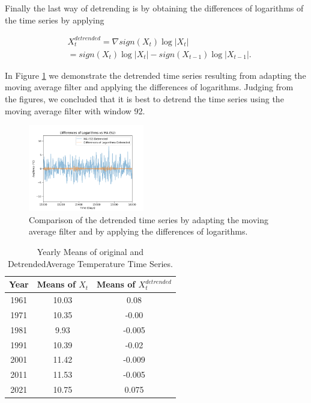 \documentclass[conference]{IEEEtran}
\begin{document}
Finally the last way of detrending is by obtaining the differences of logarithms of the time series by applying

\begin{equation}\label{diflogg}
    \begin{split}
        & X_t^{detrended} = \nabla sign(X_t)\log|X_t| \\
        & = sign(X_t)\log|X_t|-sign(X_{t-1})\log|X_{t-1}|.
    \end{split}
\end{equation}

In Figure \ref{airfdvsmag} we demonstrate the detrended time series resulting from adapting the moving average filter and applying the differences of logarithms. Judging from the figures, we concluded that it is best to detrend the time series using the moving average filter with window 92. 

\begin{figure}[ht]
    \centering
    \includegraphics[width=0.45\textwidth]{Figures/GlasnevinLin/Differences of Logarithms vs MA (92).png}
    \caption{Comparison of the detrended time series by adapting the moving average filter and by applying the differences of logarithms.}
    \label{airfdvsmag}
\end{figure}

\begin{table}
\begin{center}
\begin{tabular}{||c||c||c||} 
 \hline 
 Year & Means of $X_t$ & Means of $X_t^{detrended}$ \\ [0.5ex] 
 \hline\hline
 1961 & 10.03 & 0.08 \\ 
 \hline
 1971 & 10.35 & -0.00 \\
 \hline
 1981 & 9.93 & -0.005\\
 \hline
 1991 & 10.39 &  -0.02\\
 \hline
 2001 & 11.42 &  -0.009\\
 \hline
 2011 & 11.53 &  -0.005\\
 \hline
 2021 & 10.75 &  0.075\\
 \hline
\end{tabular}
\end{center}
\caption{Yearly Means of original and Detrended\break Average Temperature Time Series.}
\label{tablemg}
\end{table}
\end{document}
